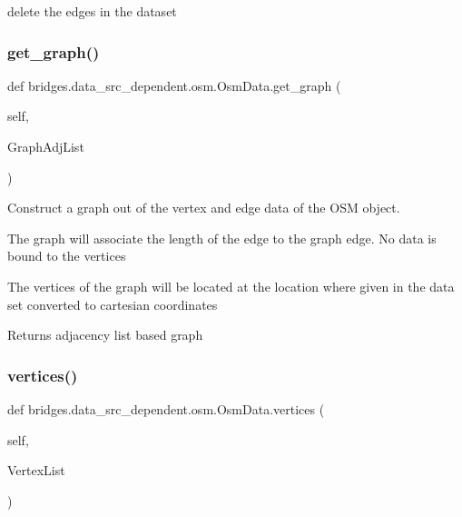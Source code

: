 delete the edges in the dataset 

\mbox{\label{classbridges_1_1data__src__dependent_1_1osm_1_1_osm_data_a50b43937ae7d87ac21378ed100fce657}} 
\subsubsection{\texorpdfstring{get\+\_\+graph()}{get\_graph()}}
{\footnotesize\ttfamily def bridges.\+data\+\_\+src\+\_\+dependent.\+osm.\+Osm\+Data.\+get\+\_\+graph (\begin{DoxyParamCaption}\item[{}]{self,  }\item[{}]{Graph\+Adj\+List }\end{DoxyParamCaption})}



Construct a graph out of the vertex and edge data of the O\+SM object. 

The graph will associate the length of the edge to the graph edge. No data is bound to the vertices

The vertices of the graph will be located at the location where given in the data set converted to cartesian coordinates

\begin{DoxyReturn}{Returns}
adjacency list based graph 
\end{DoxyReturn}
\mbox{\label{classbridges_1_1data__src__dependent_1_1osm_1_1_osm_data_a9d254d1ef4043909d4d2bd4427daae39}} 
\subsubsection{\texorpdfstring{vertices()}{vertices()}\hspace{0.1cm}{\footnotesize\ttfamily [1/3]}}
{\footnotesize\ttfamily def bridges.\+data\+\_\+src\+\_\+dependent.\+osm.\+Osm\+Data.\+vertices (\begin{DoxyParamCaption}\item[{}]{self,  }\item[{}]{Vertex\+List }\end{DoxyParamCaption})}



